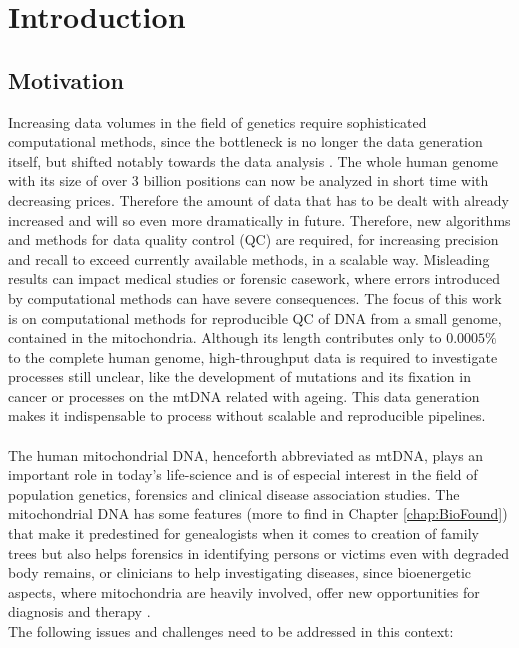 \chapter{Introduction}
\label{chapterIntro}
\section{Motivation}
Increasing data volumes in the field of genetics require sophisticated computational methods, since the bottleneck is no longer the data generation itself, but shifted notably towards the data analysis \cite{Forer2016}. The whole human genome with its size of over 3 billion positions can now be analyzed in short time with decreasing prices. Therefore the amount of data that has to be dealt with already increased and will so even more dramatically in future. Therefore, new algorithms and methods for data quality control (QC) are required, for increasing precision and recall to exceed currently available methods, in a scalable way. Misleading results can impact medical studies or forensic casework, where errors introduced by computational methods can have severe consequences. The focus of this work is on computational methods for reproducible QC of DNA from a small genome, contained in the mitochondria. Although its length contributes only to $0.0005\%$ to the complete human genome, high-throughput data is required to investigate processes still unclear, like the development of mutations and its fixation in cancer or processes on the mtDNA related with ageing. This data generation makes it indispensable to process without scalable and reproducible pipelines. 
\\
\\
The human mitochondrial DNA, henceforth abbreviated as mtDNA, plays an important role in today's life-science and is of especial interest in the field of population genetics, forensics and clinical disease association studies. The mitochondrial DNA has some features (more to find in Chapter \ref{chap:BioFound}) that make it predestined for genealogists when it comes to creation of family trees but also helps forensics in identifying persons or victims even with degraded body remains, or clinicians to help investigating diseases, since bioenergetic aspects, where mitochondria are heavily involved, offer new opportunities for diagnosis and therapy \cite{Picard2016}.
\\
The following issues and challenges need to be addressed in this context:
